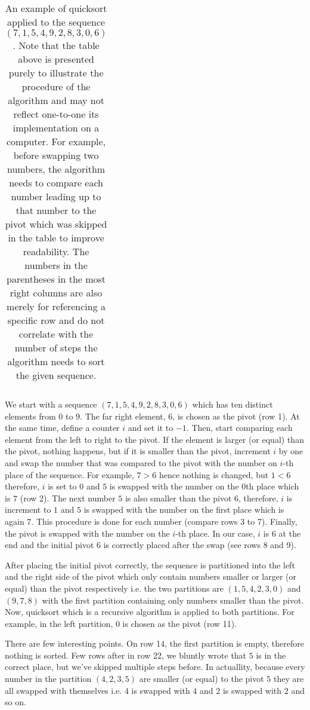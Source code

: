 \begin{center}
\begin{longtable}{ | c | c | c | c | c | c | c | c | c | c || l | }
        \caption{An example of quicksort applied to the sequence \((7, 1, 5, 4, 9, 2, 8, 3, 0, 6)\). Note that the table above is presented purely to illustrate the procedure of the algorithm and may not reflect one-to-one its implementation on a computer. For example, before swapping two numbers, the algorithm needs to compare each number leading up to that number to the pivot which was skipped in the table to improve readability. The numbers in the parentheses in the most right columns are also merely for referencing a specific row and do not correlate with the number of steps the algorithm needs to sort the given sequence.} \\
    \end{longtable}
\end{center}

We start with a sequence \((7, 1, 5, 4, 9, 2, 8, 3, 0, 6)\) which has ten distinct elements from \(0\) to \(9\). The far right element, \(6\), is chosen as the pivot (row 1). At the same time, define a counter \(i\) and set it to \(-1\). Then, start comparing each element from the left to right to the pivot. If the element is larger (or equal) than the pivot, nothing happens, but if it is smaller than the pivot, increment \(i\) by one and swap the number that was compared to the pivot with the number on \(i\)-th place of the sequence. For example, \(7 > 6\) hence nothing is changed, but \(1 < 6\) therefore, \(i\) is set to \(0\) and \(5\) is swapped with the number on the \(0\)th place which is \(7\) (row 2). The next number \(5\) is also smaller than the pivot \(6\), therefore, \(i\) is increment to \(1\) and \(5\) is swapped with the number on the first place which is again \(7\). This procedure is done for each number (compare rows 3 to 7). Finally, the pivot is swapped with the number on the \(i\)-th place. In our case, \(i\) is \(6\) at the end and the initial pivot \(6\) is correctly placed after the swap (see rows 8 and 9).

After placing the initial pivot correctly, the sequence is partitioned into the left and the right side of the pivot which only contain numbers smaller or larger (or equal) than the pivot respectively i.e. the two partitions are \((1, 5, 4, 2, 3, 0)\) and \((9, 7, 8)\) with the first partition containing only numbers smaller than the pivot. Now, quicksort which is a recursive algorithm is applied to both partitions. For example, in the left partition, \(0\) is chosen as the pivot (row 11).

There are few interesting points. On row 14, the first partition is empty, therefore nothing is sorted. Few rows after in row 22, we bluntly wrote that \(5\) is in the correct place, but we've skipped multiple steps before. In actuallity, because every number in the partition \((4, 2, 3, 5)\) are smaller (or equal) to the pivot \(5\) they are all swapped with themselves i.e. \(4\) is swapped with \(4\) and \(2\) is swapped with \(2\) and so on.